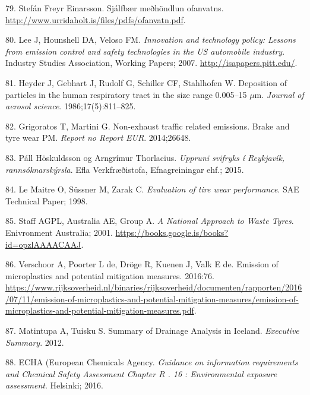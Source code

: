 \documentclass[icelandic,]{book}
\begin{document}
\leavevmode\hypertarget{ref-StefanFreyr}{}%
79. Stefán Freyr Einarsson. Sjálfbær meðhöndlun ofanvatns. \url{http://www.urridaholt.is/files/pdfs/ofanvatn.pdf}.

\leavevmode\hypertarget{ref-lee2007innovation}{}%
80. Lee J, Hounshell DA, Veloso FM. \emph{Innovation and technology policy: Lessons from emission control and safety technologies in the US automobile industry}. Industry Studies Association, Working Papers; 2007. \url{http://isapapers.pitt.edu/}.

\leavevmode\hypertarget{ref-heyder1986deposition}{}%
81. Heyder J, Gebhart J, Rudolf G, Schiller CF, Stahlhofen W. Deposition of particles in the human respiratory tract in the size range 0.005--15 \(\mu\)m. \emph{Journal of aerosol science}. 1986;17(5):811--825.

\leavevmode\hypertarget{ref-grigoratos2014non}{}%
82. Grigoratos T, Martini G. Non-exhaust traffic related emissions. Brake and tyre wear PM. \emph{Report no Report EUR}. 2014;26648.

\leavevmode\hypertarget{ref-Efla2015}{}%
83. Páll Höskuldsson og Arngrímur Thorlacius. \emph{Uppruni svifryks í Reykjavík, rannsóknarskýrsla}. Efla Verkfræðistofa, Efnagreiningar ehf.; 2015.

\leavevmode\hypertarget{ref-le1998evaluation}{}%
84. Le Maitre O, Süssner M, Zarak C. \emph{Evaluation of tire wear performance}. SAE Technical Paper; 1998.

\leavevmode\hypertarget{ref-atech2001national}{}%
85. Staff AGPL, Australia AE, Group A. \emph{A National Approach to Waste Tyres}. Enivronment Australia; 2001. \url{https://books.google.is/books?id=opzlAAAACAAJ}.

\leavevmode\hypertarget{ref-Verschoor2016}{}%
86. Verschoor A, Poorter L de, Dröge R, Kuenen J, Valk E de. Emission of microplastics and potential mitigation measures. 2016:76. \url{https://www.rijksoverheid.nl/binaries/rijksoverheid/documenten/rapporten/2016/07/11/emission-of-microplastics-and-potential-mitigation-measures/emission-of-microplastics-and-potential-mitigation-measures.pdf}.

\leavevmode\hypertarget{ref-Matinupa2012Summary}{}%
87. Matintupa A, Tuisku S. Summary of Drainage Analysis in Iceland. \emph{Executive Summary}. 2012.

\leavevmode\hypertarget{ref-ECHA2016}{}%
88. ECHA (European Chemicals Agency. \emph{Guidance on information requirements and Chemical Safety Assessment Chapter R . 16 : Environmental exposure assessment}. Helsinki; 2016.
\end{document}

